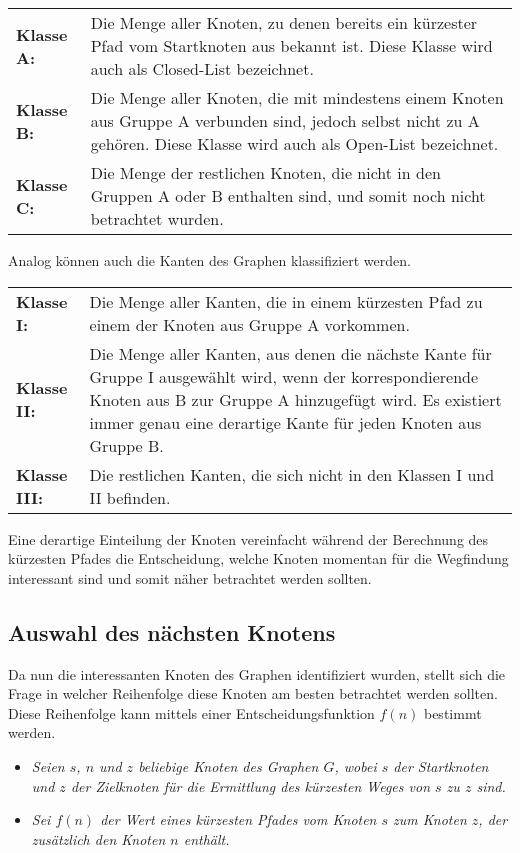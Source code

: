 		\begin{longtable}{p{2.5cm} p{10cm}}	
			\textbf{Klasse A:} & Die Menge aller Knoten, zu denen bereits ein kürzester Pfad  vom Startknoten aus bekannt ist. Diese Klasse wird auch als Closed-List bezeichnet.\\[0.25cm]
			\textbf{Klasse B:} & Die Menge aller Knoten, die mit mindestens einem Knoten aus Gruppe A verbunden sind, jedoch selbst nicht zu A gehören. Diese Klasse wird auch als Open-List bezeichnet.\\[0.25cm]
			\textbf{Klasse C:} & Die Menge der restlichen Knoten, die nicht in den Gruppen A oder B enthalten sind, und somit noch nicht betrachtet wurden.\\[0.25cm]
		\end{longtable}
		
		Analog können auch die Kanten des Graphen klassifiziert werden.
	
		\begin{longtable}{p{2.5cm} p{10cm}}
			\textbf{Klasse I:} & Die Menge aller Kanten, die in einem kürzesten Pfad zu einem der Knoten aus Gruppe A vorkommen.\\[0.25cm]
			\textbf{Klasse II:} & Die Menge aller Kanten, aus denen die nächste Kante für Gruppe I ausgewählt wird, wenn der korrespondierende Knoten aus B zur Gruppe A hinzugefügt wird. Es existiert immer genau eine derartige Kante für jeden Knoten aus Gruppe B. \\[0.25cm]
			\textbf{Klasse III:} & Die restlichen Kanten, die sich nicht in den Klassen I und II befinden.\\[0.25cm]
		\end{longtable}
		
		Eine derartige Einteilung der Knoten vereinfacht während der Berechnung des kürzesten Pfades die Entscheidung, welche Knoten momentan für die Wegfindung interessant sind und somit näher betrachtet werden sollten.
		
	\subsection{Auswahl des nächsten Knotens}
		\label{Abschaetz}
		Da nun die interessanten Knoten des Graphen identifiziert wurden, stellt sich die Frage in welcher Reihenfolge diese Knoten am besten betrachtet werden sollten.
		Diese Reihenfolge kann mittels einer Entscheidungsfunktion $f(n)$ bestimmt werden.
		
		\begin{itemize}
			\item \textit{Seien $s$, $n$ und $z$ beliebige Knoten des Graphen $G$, wobei $s$ der Startknoten und $z$ der Zielknoten für die Ermittlung des kürzesten Weges von $s$ zu $z$ sind.}\\
			\item \textit{Sei $f(n)$ der Wert eines kürzesten Pfades vom Knoten $s$ zum Knoten $z$, der zusätzlich den Knoten $n$ enthält.}
		\end{itemize}
		
